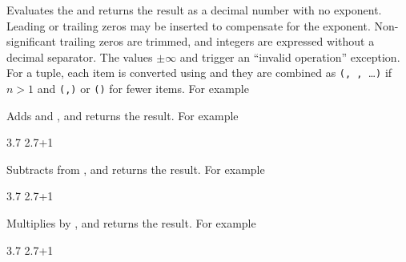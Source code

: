 \documentclass[oneside]{book}
\begin{document}
\begin{function}{\FpEval}
\begin{syntax}
 
\end{syntax}
Evaluates the  and returns the
result as a decimal number with no
exponent.  Leading or trailing zeros may be inserted to compensate
for the exponent.  Non-significant trailing zeros are trimmed, and
integers are expressed without a decimal separator.  The values
$\pm\infty$ and \nan{} trigger an \enquote{invalid operation}
exception.
For a tuple, each item is converted using  and they are combined as
\verb|(|\verb*|, |\verb*|, |\ldots{}\verb|)|
if $n>1$ and \verb|(|\verb|,)| or \verb|()| for fewer items.
For example
\begin{demohigh}
\end{demohigh}
\end{function}

\begin{function}{\FpMathAdd}
\begin{syntax}
  
\end{syntax}
Adds  and ,
and returns the result. For example
\begin{demohigh}
 {3.7}
 {2.7+1}
\end{demohigh}
\end{function}

\begin{function}{\FpMathSub}
\begin{syntax}
  
\end{syntax}
Subtracts  from ,
and returns the result. For example
\begin{demohigh}
 {3.7}
 {2.7+1}
\end{demohigh}
\end{function}

\begin{function}{\FpMathMult}
\begin{syntax}
  
\end{syntax}
Multiplies  by ,
and returns the result. For example
\begin{demohigh}
 {3.7}
 {2.7+1}
\end{demohigh}
\end{function}
\end{document}
